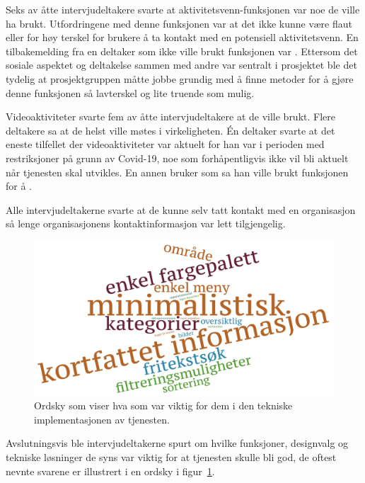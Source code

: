 Seks av åtte intervjudeltakere svarte at aktivitetsvenn-funksjonen var noe de ville ha brukt. Utfordringene med denne funksjonen var at det ikke kunne være flaut eller for høy terskel for brukere å ta kontakt med en potensiell aktivitetsvenn. En tilbakemelding fra en deltaker som ikke ville brukt funksjonen var . Ettersom det sosiale aspektet og deltakelse sammen med andre var sentralt i prosjektet ble det tydelig at prosjektgruppen måtte jobbe grundig med å finne metoder for å gjøre denne funksjonen så lavterskel og lite truende som mulig. 

Videoaktiviteter svarte fem av åtte intervjudeltakere at de ville brukt. Flere deltakere sa at de helst ville møtes i virkeligheten. Én deltaker svarte at det eneste tilfellet der videoaktiviteter var aktuelt for han var i perioden med restriksjoner på grunn av Covid-19, noe som forhåpentligvis ikke vil bli aktuelt når tjenesten skal utvikles. En annen bruker som sa han ville brukt funksjonen for å .

Alle intervjudeltakerne svarte at de kunne selv tatt kontakt med en organisasjon så lenge organisasjonens kontaktinformasjon var lett tilgjengelig.

\begin{figure}[H]
\includegraphics[width=\textwidth]{Illustrasjoner/ordsky-funksjoner.jpg}
\caption{Ordsky som viser hva som var viktig for dem i den tekniske implementasjonen av tjenesten.}
\label{fig:ordsky-funksjoner}
\end{figure}

Avslutningsvis ble intervjudeltakerne spurt om hvilke funksjoner, designvalg og tekniske løsninger de syns var viktig for at tjenesten skulle bli god, de oftest nevnte svarene er illustrert i en ordsky i figur~\ref{fig:ordsky-funksjoner}. 


